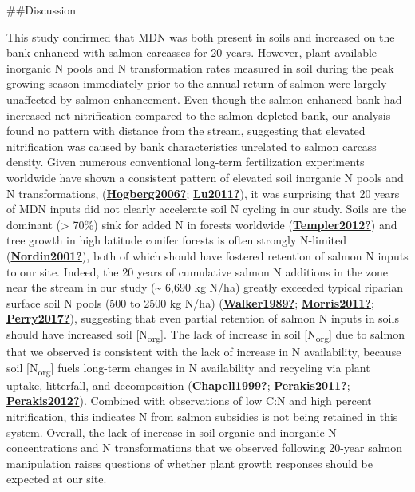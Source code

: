 \documentclass [11pt, proquest] {uwthesis}[2015/03/03]
\begin{document}
\#\#Discussion

This study confirmed that MDN was both present in soils and increased on the bank enhanced with salmon carcasses for 20 years. However, plant-available inorganic N pools and N transformation rates measured in soil during the peak growing season immediately prior to the annual return of salmon were largely unaffected by salmon enhancement. Even though the salmon enhanced bank had increased net nitrification compared to the salmon depleted bank, our analysis found no pattern with distance from the stream, suggesting that elevated nitrification was caused by bank characteristics unrelated to salmon carcass density. Given numerous conventional long-term fertilization experiments worldwide have shown a consistent pattern of elevated soil inorganic N pools and N transformations, (\protect\hyperlink{ref-Hogberg2006}{\textbf{Hogberg2006?}}; \protect\hyperlink{ref-Lu2011}{\textbf{Lu2011?}}), it was surprising that 20 years of MDN inputs did not clearly accelerate soil N cycling in our study. Soils are the dominant (\textgreater{} 70\%) sink for added N in forests worldwide (\protect\hyperlink{ref-Templer2012}{\textbf{Templer2012?}}) and tree growth in high latitude conifer forests is often strongly N-limited (\protect\hyperlink{ref-Nordin2001}{\textbf{Nordin2001?}}), both of which should have fostered retention of salmon N inputs to our site. Indeed, the 20 years of cumulative salmon N additions in the zone near the stream in our study (\textasciitilde{} 6,690 kg N/ha) greatly exceeded typical riparian surface soil N pools (500 to 2500 kg N/ha) (\protect\hyperlink{ref-Walker1989}{\textbf{Walker1989?}}; \protect\hyperlink{ref-Morris2011}{\textbf{Morris2011?}}; \protect\hyperlink{ref-Perry2017}{\textbf{Perry2017?}}), suggesting that even partial retention of salmon N inputs in soils should have increased soil {[}N\textsubscript{org}{]}. The lack of increase in soil {[}N\textsubscript{org}{]} due to salmon that we observed is consistent with the lack of increase in N availability, because soil {[}N\textsubscript{org}{]} fuels long-term changes in N availability and recycling via plant uptake, litterfall, and decomposition (\protect\hyperlink{ref-Chapell1999}{\textbf{Chapell1999?}}; \protect\hyperlink{ref-Perakis2011}{\textbf{Perakis2011?}}; \protect\hyperlink{ref-Perakis2012}{\textbf{Perakis2012?}}). Combined with observations of low C:N and high percent nitrification, this indicates N from salmon subsidies is not being retained in this system. Overall, the lack of increase in soil organic and inorganic N concentrations and N transformations that we observed following 20-year salmon manipulation raises questions of whether plant growth responses should be expected at our site.
\end{document}
